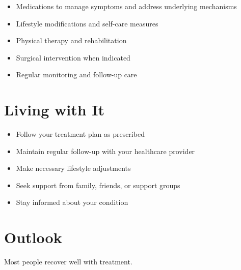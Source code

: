 \begin{itemize}[noitemsep]
  \item Medications to manage symptoms and address underlying mechanisms
  \item Lifestyle modifications and self-care measures
  \item Physical therapy and rehabilitation
  \item Surgical intervention when indicated
  \item Regular monitoring and follow-up care
\end{itemize}
\section{Living with It}
\begin{itemize}[noitemsep]
  \item Follow your treatment plan as prescribed
  \item Maintain regular follow-up with your healthcare provider
  \item Make necessary lifestyle adjustments
  \item Seek support from family, friends, or support groups
  \item Stay informed about your condition
\end{itemize}
\section{Outlook}
Most people recover well with treatment.

